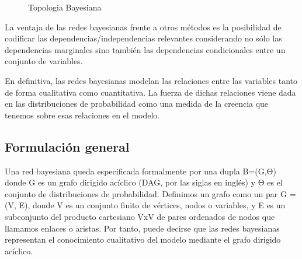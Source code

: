 \documentclass[
  a4paper,
  DIV=11,
  numbers=noendperiod]{scrreprt}
\begin{document}
\begin{figure}


\caption{\label{fig-topologia_bayesinas}Topologia Bayesiana}

\end{figure}%

La ventaja de las redes bayesianas frente a otros métodos es la
posibilidad de codificar las dependencias/independencias relevantes
considerando no sólo las dependencias marginales sino también las
dependencias condicionales entre un conjunto de variables.

En definitiva, las redes bayesianas modelan las relaciones entre las
variables tanto de forma cualitativa como cuantitativa. La fuerza de
dichas relaciones viene dada en las distribuciones de probabilidad como
una medida de la creencia que tenemos sobre esas relaciones en el
modelo.

\subsection{Formulación general}\label{formulaciuxf3n-general}

Una red bayesiana queda especificada formalmente por una dupla B=(G,Θ)
donde G es un grafo dirigido acíclico (DAG, por las siglas en inglés) y
Θ es el conjunto de distribuciones de probabilidad. Definimos un grafo
como un par G = (V, E), donde V es un conjunto finito de vértices, nodos
o variables, y E es un subconjunto del producto cartesiano VxV de pares
ordenados de nodos que llamamos enlaces o aristas. Por tanto, puede
decirse que las redes bayesianas representan el conocimiento cualitativo
del modelo mediante el grafo dirigido acíclico.
\end{document}
